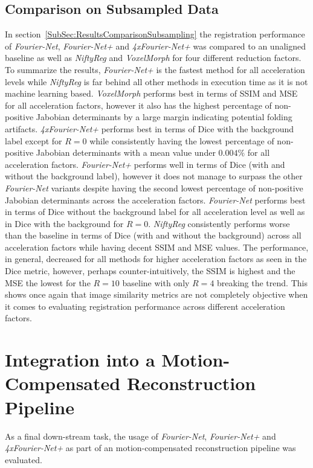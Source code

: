 \subsection{Comparison on Subsampled Data} \label{SubSec:DiscussionComparisonSubsampling}
In section~\ref{SubSec:ResultsComparisonSubsampling} the registration performance of \emph{Fourier-Net}, \emph{Fourier-Net+} and \emph{4xFourier-Net+} was compared to an unaligned baseline as well as \emph{NiftyReg} and \emph{VoxelMorph} for four different reduction factors. To summarize the results, \emph{Fourier-Net+} is the fastest method for all acceleration levels while \emph{NiftyReg} is far behind all other methods in execution time as it is not machine learning based. \emph{VoxelMorph} performs best in terms of SSIM and MSE for all acceleration factors, however it also has the highest percentage of non-positive Jabobian determinants by a large margin indicating potential folding artifacts. \emph{4xFourier-Net+} performs best in terms of Dice with the background label except for $R=0$ while consistently having the lowest percentage of non-positive Jabobian determinants with a mean value under $0.004\%$ for all acceleration factors. \emph{Fourier-Net+} performs well in terms of Dice (with and without the background label), however it does not manage to surpass the other \emph{Fourier-Net} variants despite having the second lowest percentage of non-positive Jabobian determinants across the acceleration factors. \emph{Fourier-Net} performs best in terms of Dice without the background label for all acceleration level as well as in Dice with the background for $R=0$. \emph{NiftyReg} consistently performs worse than the baseline in terms of Dice (with and without the background) across all acceleration factors while having decent SSIM and MSE values. The performance, in general, decreased for all methods for higher acceleration factors as seen in the Dice metric, however, perhaps counter-intuitively, the SSIM is highest and the MSE the lowest for the $R=10$ baseline with only $R=4$ breaking the trend. This shows once again that image similarity metrics are not completely objective when it comes to evaluating registration performance across different acceleration factors.


\section{Integration into a Motion-Compensated Reconstruction Pipeline} \label{Sec:DiscussionIntegrationMotion-CompensatedReconstructionPipeline}
As a final down-stream task, the usage of \emph{Fourier-Net}, \emph{Fourier-Net+} and \emph{4xFourier-Net+} as part of an motion-compensated reconstruction pipeline was evaluated.

